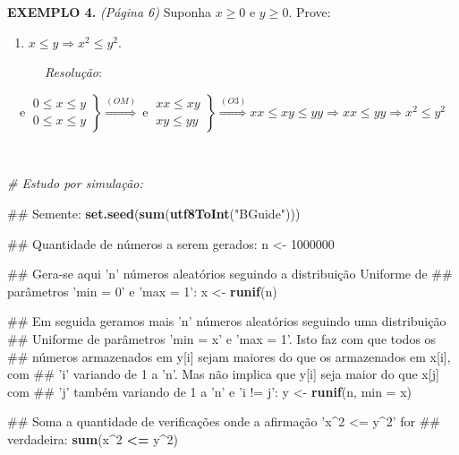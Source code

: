 \documentclass[]{book}
\newenvironment{Shaded}{\begin{snugshade}}{\end{snugshade}}
\newcommand{\KeywordTok}[1]{\textcolor[rgb]{0.13,0.29,0.53}{\textbf{#1}}}
\newcommand{\DataTypeTok}[1]{\textcolor[rgb]{0.13,0.29,0.53}{#1}}
\newcommand{\DecValTok}[1]{\textcolor[rgb]{0.00,0.00,0.81}{#1}}
\newcommand{\StringTok}[1]{\textcolor[rgb]{0.31,0.60,0.02}{#1}}
\newcommand{\CommentTok}[1]{\textcolor[rgb]{0.56,0.35,0.01}{\textit{#1}}}
\newcommand{\OperatorTok}[1]{\textcolor[rgb]{0.81,0.36,0.00}{\textbf{#1}}}
\newcommand{\NormalTok}[1]{#1}
\providecommand{\tightlist}{%
  \setlength{\itemsep}{0pt}\setlength{\parskip}{0pt}}
\begin{document}
\textbf{EXEMPLO 4.} \emph{(Página 6)} Suponha \(x \geqslant 0\) e
\(y \geqslant 0\). Prove:

\begin{enumerate}
\def\labelenumi{\alph{enumi})}
\setcounter{enumi}{1}
\tightlist
\item
  \(x \leqslant y \Rightarrow x^{2} \leqslant y^{2}\).
\end{enumerate}

~~~~~~\emph{Resolução}:

\[\textrm{e} \ \left.\begin{matrix} 0 \leqslant x \leqslant y\\ 0 \leqslant x \leqslant y \end{matrix}\right\} \overset{(OM)}{\Rightarrow} \ \textrm{e} \ \left.\begin{matrix} xx \leqslant xy \\ xy \leqslant yy \end{matrix}\right\} \overset{(O3)}{\Rightarrow} xx \leqslant xy \leqslant yy \Rightarrow xx \leqslant yy \Rightarrow x^{2} \leqslant y^{2}\]

~

\begin{Shaded}
\begin{Highlighting}[]
\CommentTok{# Estudo por simulação:}

\NormalTok{##  Semente:}
\KeywordTok{set.seed}\NormalTok{(}\KeywordTok{sum}\NormalTok{(}\KeywordTok{utf8ToInt}\NormalTok{(}\StringTok{"BGuide"}\NormalTok{)))}

\NormalTok{##  Quantidade de números a serem gerados:}
\NormalTok{n <-}\StringTok{ }\DecValTok{1000000}

\NormalTok{##  Gera-se aqui 'n' números aleatórios seguindo a distribuição Uniforme de}
\NormalTok{## parâmetros 'min = 0' e 'max = 1':}
\NormalTok{x <-}\StringTok{ }\KeywordTok{runif}\NormalTok{(n)}

\NormalTok{##  Em seguida geramos mais 'n' números aleatórios seguindo uma distribuição}
\NormalTok{## Uniforme de parâmetros 'min = x' e 'max = 1'. Isto faz com que todos os}
\NormalTok{## números armazenados em y[i] sejam maiores do que os armazenados em x[i], com}
\NormalTok{## 'i' variando de 1 a 'n'. Mas não implica que y[i] seja maior do que x[j] com}
\NormalTok{## 'j' também variando de 1 a 'n' e 'i != j':}
\NormalTok{y <-}\StringTok{ }\KeywordTok{runif}\NormalTok{(n, }\DataTypeTok{min =}\NormalTok{ x)}

\NormalTok{##  Soma a quantidade de verificações onde a afirmação 'x^2 <= y^2' for}
\NormalTok{## verdadeira:}
\KeywordTok{sum}\NormalTok{(x}\OperatorTok{^}\DecValTok{2} \OperatorTok{<=}\StringTok{ }\NormalTok{y}\OperatorTok{^}\DecValTok{2}\NormalTok{)}
\end{Highlighting}
\end{Shaded}
\end{document}
